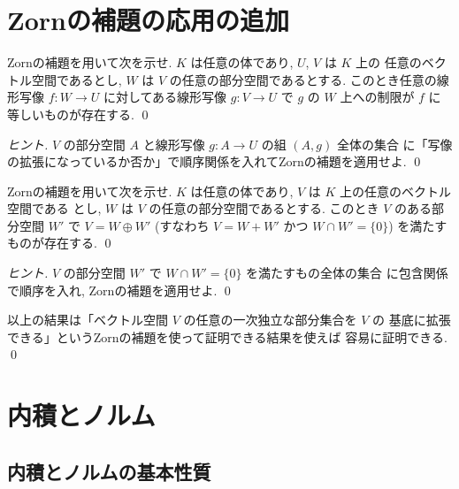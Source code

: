 \documentclass[12pt,twoside]{jarticle}
\begin{document}
\newpage

\section{Zornの補題の応用の追加}

\begin{question}[10点]
  Zornの補題を用いて次を示せ. $K$ は任意の体であり, $U$, $V$ は $K$ 上の
  任意のベクトル空間であるとし, $W$ は $V$ の任意の部分空間であるとする.
  このとき任意の線形写像 $f:W\to U$ に対してある線形写像 $g:V\to U$ 
  で $g$ の $W$ 上への制限が $f$ に等しいものが存在する.
  \qed
\end{question}

\begin{proof}[ヒント]
  $V$ の部分空間 $A$ と線形写像 $g:A\to U$ の組 $(A,g)$ 全体の集合
  に「写像の拡張になっているか否か」で順序関係を入れてZornの補題を適用せよ.
  \qed
\end{proof}

\begin{question}[10点]
  Zornの補題を用いて次を示せ. 
  $K$ は任意の体であり, $V$ は $K$ 上の任意のベクトル空間である
  とし, $W$ は $V$ の任意の部分空間であるとする.
  このとき $V$ のある部分空間 $W'$ で $V=W\oplus W'$ 
  (すなわち $V=W+W'$ かつ $W\cap W'=\{0\}$) を満たすものが存在する.
  \qed
\end{question}

\begin{proof}[ヒント]
  $V$ の部分空間 $W'$ で $W\cap W'=\{0\}$ を満たすもの全体の集合
  に包含関係で順序を入れ, Zornの補題を適用せよ.
  \qed
\end{proof}

\begin{rem}
  以上の結果は「ベクトル空間 $V$ の任意の一次独立な部分集合を $V$ の
  基底に拡張できる」というZornの補題を使って証明できる結果を使えば
  容易に証明できる.
  \qed
\end{rem}


\section{内積とノルム}


\subsection{内積とノルムの基本性質}
\end{document}
